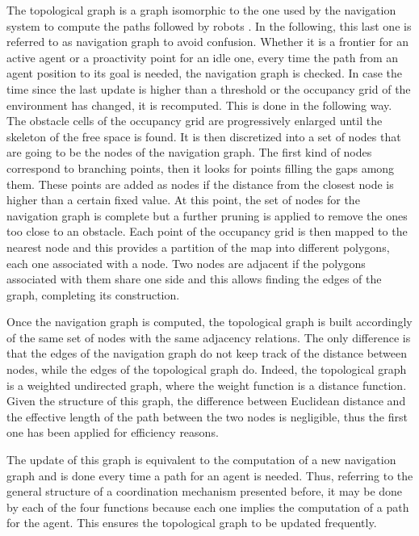 The topological graph is a graph isomorphic to the one used by the
navigation system to compute the paths followed by robots \cite{Spirin2015}. 
In the following, this last one is referred to as navigation graph to avoid
confusion. Whether it is a frontier for an active agent or a proactivity
point for an idle one, every time the path from an agent position
to its goal is needed, the navigation graph is checked. In case the
time since the last update is higher than a threshold or the occupancy
grid of the environment has changed, it is recomputed. This is done
in the following way. The obstacle cells of the occupancy grid are
progressively enlarged until the skeleton of the free space is found.
It is then discretized into a set of nodes that are going to be the
nodes of the navigation graph. The first kind of nodes correspond
to branching points, then it looks for points filling the gaps among
them. These points are added as nodes if the distance from the closest
node is higher than a certain fixed value. At this point, the set
of nodes for the navigation graph is complete but a further pruning
is applied to remove the ones too close to an obstacle. Each point
of the occupancy grid is then mapped to the nearest node and this
provides a partition of the map into different polygons, each one
associated with a node. Two nodes are adjacent if the polygons associated
with them share one side and this allows finding the edges of the
graph, completing its construction. 

Once the navigation graph is computed, the topological graph is built
accordingly of the same set of nodes with the same adjacency relations.
The only difference is that the edges of the navigation graph do not
keep track of the distance between nodes, while the edges of the topological
graph do. Indeed, the topological graph is a weighted undirected graph,
where the weight function is a distance function. Given the structure
of this graph, the difference between Euclidean distance and the effective
length of the path between the two nodes is negligible, thus the first
one has been applied for efficiency reasons. 

The update of this graph is equivalent to the computation of a new
navigation graph and is done every time a path for an agent is needed.
Thus, referring to the general structure of a coordination mechanism
presented before, it may be done by each of the four functions because
each one implies the computation of a path for the agent. This ensures
the topological graph to be updated frequently. 

